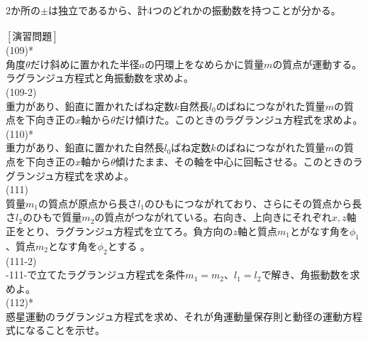\documentclass{jsarticle}
\begin{document}
2か所の\(\pm\)は独立であるから、計4つのどれかの振動数を持つことが分かる。\\
\\
\newpage
\noindent
\([演習問題]\)\\
(109)*\\
角度\(\theta\)だけ斜めに置かれた半径\(a\)の円環上をなめらかに質量\(m\)の質点が運動する。ラグランジュ方程式と角振動数を求めよ。\\
(109-2)\\
重力があり、鉛直に置かれたばね定数\(k\)自然長\(l_{0}\)のばねにつながれた質量\(m\)の質点を下向き正の\(x\)軸から\(\theta\)だけ傾けた。このときのラグランジュ方程式を求めよ。\\
(110)*\\
重力があり、鉛直に置かれた自然長\(l_{0}\)ばね定数\(k\)のばねにつながれた質量\(m\)の質点を下向き正の\(x\)軸から\(\theta\)傾けたまま、その軸を中心に回転させる。このときのラグランジュ方程式を求めよ。\\
(111)\\
質量\(m_{1}\)の質点が原点から長さ\(l_{1}\)のひもにつながれており、さらにその質点から長さ\(l_{2}\)のひもで質量\(m_{2}\)の質点がつながれている。右向き、上向きにそれぞれ\(x,z\)軸正をとり、ラグランジュ方程式を立てろ。負方向の\(z\)軸と質点\(m_{1}\)とがなす角を\(\phi_{1}\)、質点\(m_{2}\)となす角を\(\phi_{2}\)とする
。\\
(111-2)\\
-111-で立てたラグランジュ方程式を条件\(m_{1}=m_{2}\)、\(l_{1}=l_{2}\)で解き、角振動数を求めよ。\\
(112)*\\
惑星運動のラグランジュ方程式を求め、それが角運動量保存則と動径の運動方程式になることを示せ。\\
\end{document}
